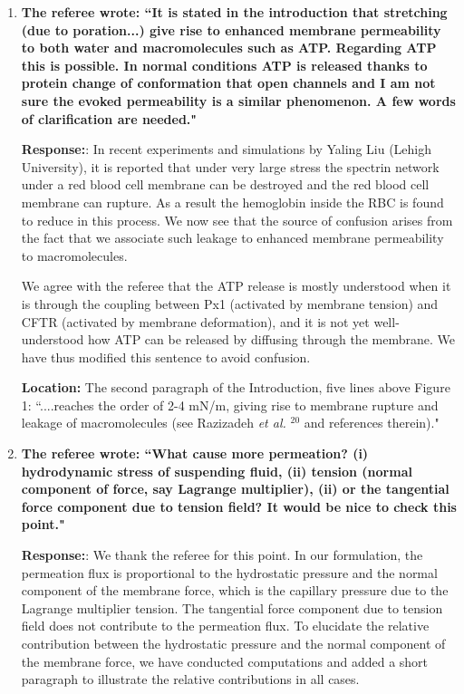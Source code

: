 \documentclass[12pt]{article}
\begin{document}
\begin{enumerate}
\item {\bf 
The referee wrote:
``It is stated in the introduction that stretching (due to
    poration...) give rise to enhanced membrane permeability to
    both water and macromolecules such as ATP. Regarding ATP this is
    possible. In normal conditions ATP is released thanks to protein
    change of conformation that open channels and I am not sure the
    evoked permeability is a similar phenomenon. A few words of
    clarification are needed."}

\noindent
{\bf Response:}: In recent experiments and simulations by Yaling Liu (Lehigh University), it is reported that under very large stress the spectrin network under a red blood cell membrane can be destroyed and the red blood cell membrane can rupture. As a result the hemoglobin inside the RBC is found to reduce in this process. We now see that the source of confusion arises from the fact that we associate such leakage to enhanced membrane permeability to macromolecules. 

We agree with the referee that the ATP release is mostly understood when
    it is through the coupling between Px1 (activated by membrane
    tension) and CFTR (activated by membrane deformation), and it is not
    yet well-understood how ATP can be released by diffusing through the
    membrane. We have thus modified this sentence to avoid confusion.

\noindent
{\bf Location:}  The second paragraph of the Introduction, five lines
    above Figure 1: ``....reaches the order of 2-4 mN/m, giving rise to
    membrane rupture and leakage of macromolecules (see Razizadeh {\it
    et al. }$^{20}$ and references therein)."

\item {\bf
The referee wrote:
``What cause more permeation? (i) hydrodynamic stress of suspending
fluid, (ii) tension (normal component of force, say Lagrange
multiplier), (ii) or the tangential force component due to tension
field? It would be nice to check this point."}

\noindent
{\bf Response:}: We thank the referee for this point. In our
    formulation, the permeation flux is proportional to the hydrostatic
    pressure and the normal component of the membrane force, which is
    the capillary pressure due to the Lagrange multiplier tension. The
    tangential force component due to tension field does not contribute
    to the permeation flux. To elucidate the relative contribution
    between the hydrostatic pressure and the normal component of the
    membrane force, we have conducted computations and added a short
    paragraph to illustrate the relative contributions in all cases.


\end{enumerate}
\end{document}
